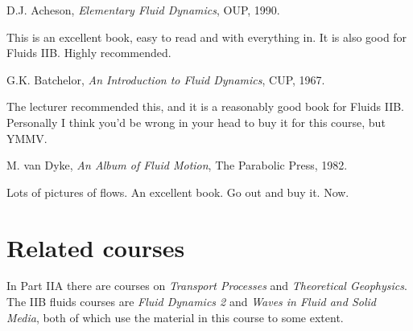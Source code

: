 \documentclass{notes}
\begin{document}
\begin{thebibliography}{9}
 D.J. Acheson, \emph{Elementary Fluid
    Dynamics}, OUP, 1990.
  
  {\sffamily \small This is an excellent book, easy to read and with
    everything in.  It is also good for Fluids IIB.  Highly
    recommended.}
  
 G.K. Batchelor, \emph{An Introduction to Fluid
    Dynamics}, CUP, 1967.
  
  {\sffamily \small The lecturer recommended this, and it is a
    reasonably good book for Fluids IIB.  Personally I think you'd be
    wrong in your head to buy it for this course, but YMMV.}
  
 M. van Dyke, \emph{An Album of Fluid Motion}, The
  Parabolic Press, 1982.
  
  {\sffamily \small Lots of pictures of flows.  An excellent book.  Go
    out and buy it.  Now.}
\end{thebibliography}

\section*{Related courses}

In Part IIA there are courses on \emph{Transport Processes} and
\emph{Theoretical Geophysics}.  The IIB fluids courses are \emph{Fluid
  Dynamics 2} and \emph{Waves in Fluid and Solid Media}, both of which
use the material in this course to some extent.
\end{document}
